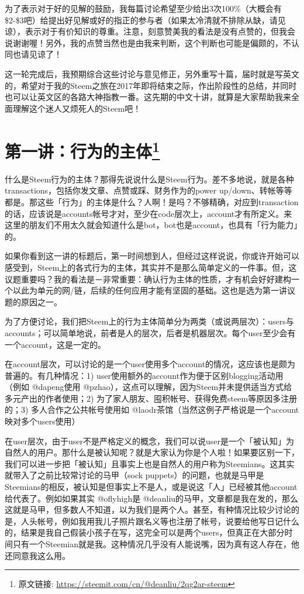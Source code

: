 \documentclass[]{ctexbook}
\begin{document}
为了表示对于好的见解的鼓励，我每篇讨论希望至少给出3次100\%（大概会有\$2-\$3吧）给提出好见解或好的指正的参与者（如果太冷清就不排除从缺，请见谅），表示对于有价知识的尊重。注意，刻意赞美我的看法是没有点赞的，但我会说谢谢喔！另外，我的点赞当然也是由我来判断，这个判断也可能是偏颇的，不认同也请见谅了！

这一轮完成后，我预期综合这些讨论与意见修正，另外重写十篇，届时就是写英文的，希望对于我的Steem之旅在2017年即将结束之际，作出阶段性的总结，并同时也可以让英文区的各路大神指教一番。这先期的中文十讲，就算是大家帮助我来全面理解这个迷人又烦死人的Steem吧！

\hypertarget{liu1}{%
\section[第一讲：行为的主体]{\texorpdfstring{第一讲：行为的主体\footnote{原文链接: \url{https://steemit.com/cn/@deanliu/2qg2ar-steem}}}{第一讲：行为的主体}}\label{liu1}}

什么是Steem行为的主体？那得先说说什么是Steem行为。差不多地说，就是各种transactions，包括你发文章、点赞或踩、财务作为的power up/down、转帐等等都是。那这些「行为」的主体是什么？人啊！是吗？不够精确，对应到transaction的话，应该说是accounts帐号才对，至少在code层次上，account才有所定义。来这里的朋友们不用太久就会知道什么是bot，bot也是account，也具有「行为能力」的。

如果你看到这一讲的标题后，第一时间想到人，但经过这样说说，你或许开始可以感受到，Steem上的各式行为的主体，其实并不是那么简单定义的一件事。但，这议题重要吗？我的看法是－非常重要：确认行为主体的性质，才有机会好好建构一个以此为单元的网/链，后续的任何应用才能有坚固的基础。这也是选为第一讲议题的原因之一。

为了方便讨论，我们把Steem上的行为主体简单分为两类（或说两层次）：users与accounts；可以简单地说，前者是人的层次，后者是机器层次。每个user至少会有一个account，这是一定的。

在account层次，可以讨论的是一个user使用多个account的情况，这应该也是颇为普遍的。有几种情况：1) user使用额外的account作为便于区别blogging活动用（例如 @dapeng使用 @pzhao），这点可以理解，因为Steem并未提供适当方式给多元产出的作者使用；2) 为了家人朋友、囤积帐号、获得免费steem等原因多注册的；3) 多人合作之公共帐号使用如 @laodr茶馆（当然这例子严格说是一个account映对多个users使用）

在user层次，由于user不是严格定义的概念，我们可以说user是一个「被认知」为自然人的用户。那什么是被认知呢？就是大家认为你是个人啦！如果要区别一下，我们可以进一步把「被认知」且事实上也是自然人的用户称为Steemians。这其实就带入了之前比较常讨论的马甲（sock puppets）的问题，也就是马甲是Steemians的相反，被认知是但事实上不是人，或是说这「人」已经被其他account给代表了。例如如果其实 @oflyhigh是 @deanliu的马甲，文章都是我在发的，那么这就是马甲，但多数人不知道，以为我们是两个人。甚至，有种情况比较少讨论的是，人头帐号，例如我用我儿子照片跟名义等也注册了帐号，说要给他写日记什么的，结果是我自己假装小孩子在写，这完全可以是两个users，但真正在大部分时间只有一个Steemian就是我。这种情况几乎没有人能说嘴，因为真有这人存在，他还同意我这么用。
\end{document}
